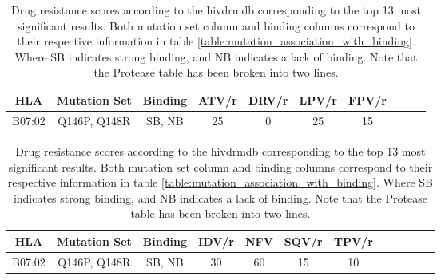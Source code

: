 \begin{table}[h]
    \begin{tabular}{||c|c|c||c|c|c|c|c|c|c||}
        \hline
        HLA    & Mutation Set & Binding & ATV/r & DRV/r & LPV/r & FPV/r \\
        \hline
        \hline
        B07:02 & Q146P, Q148R & SB, NB  & 25    & 0     & 25    & 15    \\
        \hline
    \end{tabular}
    \begin{tabular}{|c|c|c||c|c|c|c|c|c|c|c|c||}
        \hline
        HLA    & Mutation Set & Binding & IDV/r & NFV & SQV/r & TPV/r \\
        \hline
        \hline
        B07:02 & Q146P, Q148R & SB, NB  & 30    & 60  & 15    & 10    \\
        \hline
    \end{tabular}
    \caption{Drug resistance scores according to the \acl{hivdrmdb} corresponding to the top 13 most significant results. Both mutation set column and binding columns correspond to their respective information in table \ref{table:mutation_association_with_binding}. Where SB indicates strong binding, and NB indicates a lack of binding. Note that the Protease table has been broken into two lines.}
    \label{table:significantly_associated_mutation_drm_scores}
\end{table}